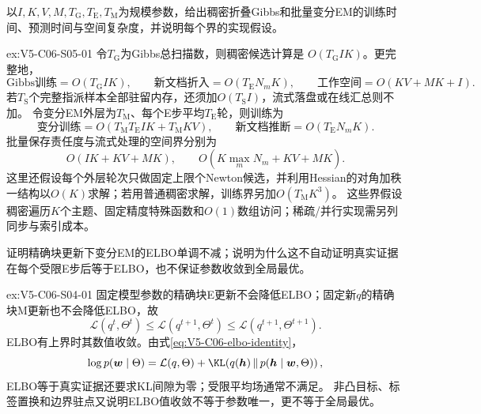 \begin{SLChapterExercisePairSection}
\begin{exercise}\label{ex:V5-C06-S05-01}
以$I,K,V,M,T_{\mathrm G},T_{\mathrm E},T_{\mathrm M}$为规模参数，给出稠密折叠Gibbs和批量变分EM的训练时间、预测时间与空间复杂度，并说明每个界的实现假设。
\end{exercise}
\ifSLFullEdition
{}\label{sol:V5-C06-S05-01}
\begin{chapterexercisesolution}{ex:V5-C06-S05-01}
\nopagebreak[4]
令$T_{\mathrm G}$为Gibbs总扫描数，则稠密候选计算是
$O(T_{\mathrm G}IK)$。更完整地，
\[
\text{Gibbs训练}=O(T_{\mathrm G}IK),\qquad
\text{新文档折入}=O(T_{\mathrm E}N_mK),\qquad
\text{工作空间}=O(KV+MK+I).
\]
若$T_{\mathrm S}$个完整指派样本全部驻留内存，还须加$O(T_{\mathrm S}I)$，流式落盘或在线汇总则不加。
令变分EM外层为$T_{\mathrm M}$、每个E步平均$T_{\mathrm E}$轮，则训练为
\[
\text{变分训练}
=O(T_{\mathrm M}T_{\mathrm E}IK+T_{\mathrm M}KV),\qquad
\text{新文档推断}=O(T_{\mathrm E}N_mK).
\]
批量保存责任度与流式处理的空间界分别为
\[
O(IK+KV+MK),\qquad
O(K\max_mN_m+KV+MK).
\]
这里还假设每个外层轮次只做固定上限个Newton候选，并利用Hessian的对角加秩一结构以$O(K)$求解；若用普通稠密求解，训练界另加$O(T_{\mathrm M}K^3)$。
这些界假设稠密遍历$K$个主题、固定精度特殊函数和$O(1)$数组访问；稀疏/并行实现需另列同步与索引成本。
\end{chapterexercisesolution}
\fi

\begin{exercise}\label{ex:V5-C06-S04-01}
证明精确块更新下变分EM的ELBO单调不减；说明为什么这不自动证明真实证据在每个受限E步后等于ELBO，也不保证参数收敛到全局最优。
\end{exercise}
\ifSLFullEdition
{}\label{sol:V5-C06-S04-01}
\begin{chapterexercisesolution}{ex:V5-C06-S04-01}
\nopagebreak[4]
固定模型参数的精确块E更新不会降低ELBO；固定新$q$的精确块M更新也不会降低ELBO，故
\[
\mathcal L(q^{t},\Theta^{t})
\le\mathcal L(q^{t+1},\Theta^{t})
\le\mathcal L(q^{t+1},\Theta^{t+1}).
\]
ELBO有上界时其数值收敛。由式\eqref{eq:V5-C06-elbo-identity}，
\[
\log p(\boldsymbol w\mid\Theta)
=\mathcal L(q,\Theta)
+\KL\!\left(q(\boldsymbol h)\,\middle\|\,p(\boldsymbol h\mid\boldsymbol w,\Theta)\right),
\]
ELBO等于真实证据还要求KL间隙为零；受限平均场通常不满足。
非凸目标、标签置换和边界驻点又说明ELBO值收敛不等于参数唯一，更不等于全局最优。
\end{chapterexercisesolution}
\fi


\end{SLChapterExercisePairSection}
